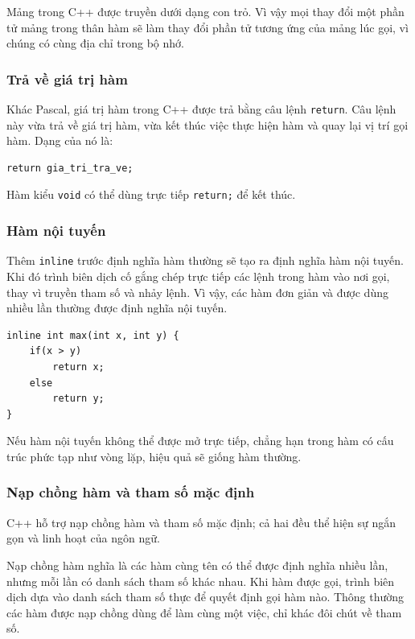 \documentclass[11pt]{article}
\newcommand{\cpp}{C++}
\newcommand{\pascal}{Pascal}
\begin{document}
Mảng trong \cpp{} được truyền dưới dạng con trỏ. Vì vậy mọi thay đổi một phần
tử mảng trong thân hàm sẽ làm thay đổi phần tử tương ứng của mảng lúc gọi,
vì chúng có cùng địa chỉ trong bộ nhớ.

\subsubsection*{Trả về giá trị hàm}

Khác \pascal{}, giá trị hàm trong \cpp{} được trả bằng câu lệnh
\verb|return|. Câu lệnh này vừa trả về giá trị hàm, vừa kết thúc việc thực
hiện hàm và quay lại vị trí gọi hàm. Dạng của nó là:

\begin{verbatim}
return gia_tri_tra_ve;
\end{verbatim}

Hàm kiểu \verb|void| có thể dùng trực tiếp \verb|return;| để kết thúc.

\subsubsection*{Hàm nội tuyến}

Thêm \verb|inline| trước định nghĩa hàm thường sẽ tạo ra định nghĩa hàm nội
tuyến. Khi đó trình biên dịch cố gắng chép trực tiếp các lệnh trong hàm vào
nơi gọi, thay vì truyền tham số và nhảy lệnh. Vì vậy, các hàm đơn giản và
được dùng nhiều lần thường được định nghĩa nội tuyến.

\begin{verbatim}
inline int max(int x, int y) {
    if(x > y)
        return x;
    else
        return y;
}
\end{verbatim}

Nếu hàm nội tuyến không thể được mở trực tiếp, chẳng hạn trong hàm có cấu
trúc phức tạp như vòng lặp, hiệu quả sẽ giống hàm thường.

\subsubsection*{Nạp chồng hàm và tham số mặc định}

\cpp{} hỗ trợ nạp chồng hàm và tham số mặc định; cả hai đều thể hiện sự ngắn
gọn và linh hoạt của ngôn ngữ.

Nạp chồng hàm nghĩa là các hàm cùng tên có thể được định nghĩa nhiều lần,
nhưng mỗi lần có danh sách tham số khác nhau. Khi hàm được gọi, trình biên
dịch dựa vào danh sách tham số thực để quyết định gọi hàm nào. Thông thường
các hàm được nạp chồng dùng để làm cùng một việc, chỉ khác đôi chút về tham
số.
\end{document}
